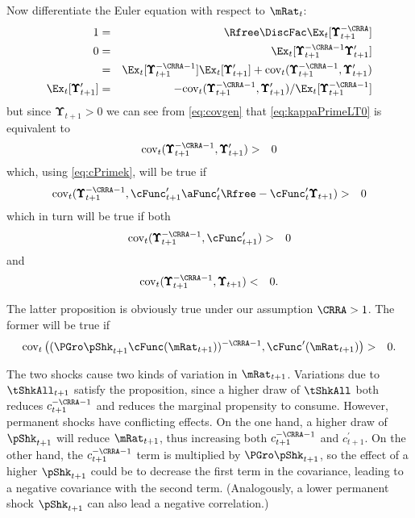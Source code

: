 \documentclass[titlepage]{\econtex}\providecommand{\texname}{BufferStockTheory}%
\begin{document}
{Now differentiate the Euler equation with respect to $\mRat_{t}$:
\begin{eqnarray}
  1 & = & \Rfree \DiscFac \Ex_{t}[ \pmb{\Upsilon}_{t+1}^{-\CRRA}] \notag
\\ 0 & = & \Ex_{t}[\pmb{\Upsilon}_{t+1}^{-\CRRA-1} \pmb{\Upsilon}_{t+1}^{\prime}] \notag
\\ & = & \Ex_{t}[\pmb{\Upsilon}_{t+1}^{-\CRRA-1}]\Ex_{t}[\pmb{\Upsilon}_{t+1}^{\prime}]+\mbox{cov}_{t}(\pmb{\Upsilon}_{t+1}^{-\CRRA-1},\pmb{\Upsilon}_{t+1}^{\prime}) \notag
\\ \Ex_{t}[\pmb{\Upsilon}_{t+1}^{\prime}] & = & -\mbox{cov}_{t}(\pmb{\Upsilon}_{t+1}^{-\CRRA-1},\pmb{\Upsilon}_{t+1}^{\prime})/\Ex_{t}[\pmb{\Upsilon}_{t+1}^{-\CRRA-1}] \label{eq:covgen}
\end{eqnarray}
but since $\pmb{\Upsilon}_{t+1} > 0$ we can see from \eqref{eq:covgen} that \eqref{eq:kappaPrimeLT0} is equivalent to
\begin{eqnarray}
 \mbox{cov}_{t}(\pmb{\Upsilon}_{t+1}^{-\CRRA-1},\pmb{\Upsilon}_{t+1}^{\prime}) & > & 0 \nonumber
\end{eqnarray}
which, using \eqref{eq:cPrimek}, will be true if
\begin{eqnarray}
 \mbox{cov}_{t}(\pmb{\Upsilon}_{t+1}^{-\CRRA-1},\cFunc^{\prime}_{t+1}\aFunc^{\prime}_{t}\Rfree - \cFunc^{\prime}_{t}\pmb{\Upsilon}_{t+1}) & > & 0 \notag
\end{eqnarray}
which in turn will be true if both
\begin{eqnarray}
  \mbox{cov}_{t}(\pmb{\Upsilon}_{t+1}^{-\CRRA-1},\cFunc^{\prime}_{t+1} ) & > & 0 \notag
\end{eqnarray}
and
\begin{eqnarray*}
  \mbox{cov}_{t}(\pmb{\Upsilon}_{t+1}^{-\CRRA-1},\pmb{\Upsilon}_{t+1}) & < & 0. \notag
\end{eqnarray*}

The latter proposition is obviously true under our assumption $\CRRA > 1$.  The former will be true if
\begin{eqnarray*}
  \mbox{cov}_{t}\left((\PGro \pShk_{t+1} \cFunc(\mRat_{t+1}))^{-\CRRA-1},\cFunc^{\prime}(\mRat_{t+1}) \right) & > & 0 \nonumber.
\end{eqnarray*}}

The two shocks cause two kinds of variation in $\mRat_{t+1}$.
Variations due to $\tShkAll_{t+1}$ satisfy the proposition, since a
higher draw of $\tShkAll$ both reduces $c_{t+1}^{-\CRRA-1}$ and
reduces the marginal propensity to consume.  However, permanent shocks
have conflicting effects.  On the one hand, a higher draw of
$\pShk_{t+1}$ will reduce $\mRat_{t+1}$, thus increasing both
$c_{t+1}^{-\CRRA-1}$ and $c_{t+1}^{\prime}$.  On the other hand, the
$c_{t+1}^{-\CRRA-1}$ term is multiplied by $\PGro \pShk_{t+1}$, so the
effect of a higher $\pShk_{t+1}$ could be to decrease the first term
in the covariance, leading to a negative covariance with the second
term.  (Analogously, a lower permanent shock $\pShk_{t+1}$ can also
lead a negative correlation.)
\end{document}

